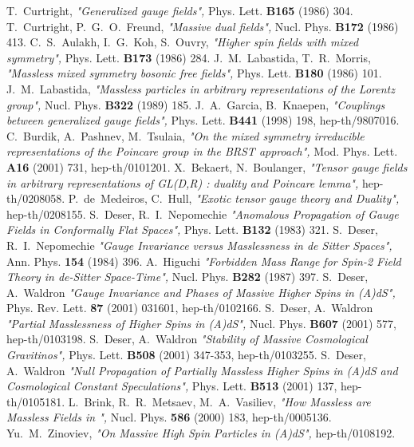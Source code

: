 \documentclass[a4paper,12pt]{article}
\begin{document}
\newpage

\begin{thebibliography}{99}
T.~Curtright, {\it "Generalized gauge fields",} Phys. Lett. {\bf B165}
(1986) 304.
T.~Curtright, P.~G.~O.~Freund, {\it "Massive dual fields",} Nucl. Phys.
{\bf B172} (1986) 413.
C.~S.~Aulakh, I.~G.~Koh, S.~Ouvry, {\it "Higher spin fields with mixed
symmetry",} Phys. Lett. {\bf B173} (1986) 284.
J.~M.~Labastida, T.~R.~Morris, {\it "Massless mixed symmetry bosonic
free fields",} Phys. Lett. {\bf B180} (1986) 101.
J.~M.~Labastida, {\it "Massless particles in arbitrary representations
of the Lorentz group",} Nucl. Phys. {\bf B322} (1989) 185.
J.~A.~Garcia, B.~Knaepen, {\it "Couplings between generalized gauge
fields",} Phys. Lett. {\bf B441} (1998) 198, hep-th/9807016.
C.~Burdik, A.~Pashnev, M.~Tsulaia, {\it "On the mixed symmetry irreducible
representations of the Poincare group in the BRST approach",} Mod. Phys. Lett.
{\bf A16} (2001) 731, hep-th/0101201.
X.~Bekaert, N.~Boulanger, {\it "Tensor gauge fields in arbitrary
representations of GL(D,R) : duality and Poincare lemma", } hep-th/0208058.
P.~de~Medeiros, C.~Hull, {\it "Exotic tensor gauge theory and Duality", }
hep-th/0208155.
S.~Deser, R.~I.~Nepomechie {\it "Anomalous Propagation of Gauge Fields
in Conformally Flat Spaces",} Phys. Lett. {\bf B132} (1983) 321.
S.~Deser, R.~I.~Nepomechie {\it "Gauge Invariance versus Masslessness
in de Sitter Spaces",} Ann. Phys. {\bf 154} (1984) 396.
A.~Higuchi {\it "Forbidden Mass Range for Spin-2 Field Theory in
de-Sitter Space-Time",} Nucl. Phys. {\bf B282} (1987) 397.
S.~Deser, A.~Waldron {\it "Gauge Invariance and Phases of Massive
Higher Spins in (A)dS",} Phys. Rev. Lett. {\bf 87} (2001) 031601,
hep-th/0102166.
S.~Deser, A.~Waldron {\it "Partial Masslessness of Higher Spins in
(A)dS",} Nucl. Phys. {\bf B607} (2001) 577, hep-th/0103198.
S.~Deser, A.~Waldron {\it "Stability of Massive Cosmological
Gravitinos",} Phys. Lett. {\bf B508} (2001) 347-353, hep-th/0103255.
S.~Deser, A.~Waldron {\it "Null Propagation of Partially Massless
Higher Spins in (A)dS and Cosmological Constant Speculations",}
Phys. Lett. {\bf B513} (2001) 137, hep-th/0105181.
L.~Brink, R.~R.~Metsaev, M.~A.~Vasiliev, {\it "How Massless are Massless
Fields in \coordHE{}",} Nucl. Phys. {\bf 586} (2000) 183, hep-th/0005136.
Yu.~M.~Zinoviev, {\it "On Massive High Spin Particles in (A)dS",}
hep-th/0108192.
\end{thebibliography}
\end{document}
